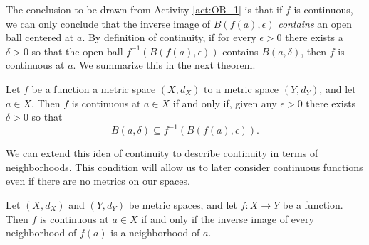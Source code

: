 \begin{comment}

\ActivitySolution
\ba
\item The set $B(f(2),1)$ is the interval $(f(2)-1,f(2)+1) = (3,5)$ in $\R$.

\item The set of points in $\R$ that map into $B(f(2),1)$ is the interval $(\sqrt{3}, \sqrt{5})$. 

\item Since $\sqrt{5} - 2 \approx 0.236$ and $2 - \sqrt{3} \approx 0.2679$, the set $f^{-1}\left(B(f(2), 1)\right)$ only contains an open ball centered at $2$, but is not itself an open ball centered at 2. 

\ea

\end{comment}

The conclusion to be drawn from Activity \ref{act:OB_1} is that if $f$ is continuous, we can only conclude that the inverse image of $B(f(a), \epsilon)$ \emph{contains} an open ball centered at $a$. By definition of continuity, if for every $\epsilon > 0$ there exists a $\delta > 0$ so that the open ball $f^{-1}\left(B(f(a), \epsilon)\right)$ contains $B(a, \delta)$, then $f$ is continuous at $a$. We summarize this in the next theorem.


\begin{theorem} \label{thm:open_ball_continuity} Let $f$ be a function a metric space $(X, d_X)$ to a metric space $(Y, d_Y)$, and let $a \in X$. Then $f$ is continuous at $a \in X$ if and only if, given any $\epsilon > 0$ there exists $\delta > 0$ so that 
\[B(a, \delta) \subseteq f^{-1}\left(B(f(a), \epsilon)\right).\]
\end{theorem}

We can extend this idea of continuity to describe continuity in terms of neighborhoods. This condition will allow us to later consider continuous functions even if there are no metrics on our spaces. 

\begin{theorem} Let $(X, d_X)$ and $(Y,d_Y)$ be metric spaces, and let $f : X \to Y$ be a function. Then $f$ is continuous at $a \in X$ if and only if the inverse image of every neighborhood of $f(a)$ is a neighborhood of $a$. 
\end{theorem}


